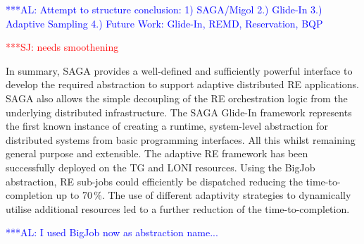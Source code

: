 \documentclass{rspublic}
\newcommand{\alnote}[1]{ {\textcolor{blue} { ***AL: #1 }}}
\newcommand{\jhanote}[1]{ {\textcolor{red} { ***SJ: #1 }}}
\newcommand{\alnote}[1]{}
\newcommand{\jhanote}[1]{}
\newcommand{\glidein}[1]{Glide-In }
\begin{document}
\alnote{Attempt to structure conclusion: 1) SAGA/Migol 2.) Glide-In
  3.) Adaptive Sampling 4.) Future Work: Glide-In, REMD, Reservation,
  BQP}
                                         
\jhanote{needs smoothening} 

In summary, SAGA provides a well-defined and sufficiently powerful
interface to develop the required abstraction to support adaptive
distributed RE applications.  SAGA also allows the simple decoupling
of the RE orchestration logic from the underlying distributed
infrastructure. The SAGA \glidein\ framework represents the first
known instance of creating a runtime, system-level abstraction for
distributed systems from basic programming interfaces. All this whilst
remaining general purpose and extensible.  The adaptive RE framework
has been successfully deployed on the TG and LONI resources.  Using
the BigJob abstraction, RE sub-jobs could efficiently be dispatched
reducing the time-to-completion up to 70\,\%. The use of different
adaptivity strategies to dynamically utilise additional resources led
to a further reduction of the time-to-completion.


\alnote{I used BigJob now as abstraction name...}  

\end{document}
